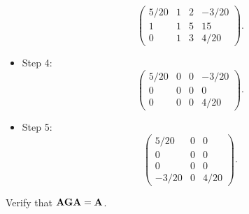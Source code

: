 \begin{Example}{}{}
\begin{itemize}
\[\begin{pmatrix}
                      5/20 & 1 & 2 & -3/20 \\
                      1    & 1 & 5 & 15    \\
                      0    & 1 & 3 & 4/20
                  \end{pmatrix}. \]
        \item Step 4:
              \[ \begin{pmatrix}
                      5/20 & 0 & 0 & -3/20 \\
                      0    & 0 & 0 & 0     \\
                      0    & 0 & 0 & 4/20
                  \end{pmatrix}. \]
        \item Step 5:
              \[ \begin{pmatrix}
                      5/20  & 0 & 0    \\
                      0     & 0 & 0    \\
                      0     & 0 & 0    \\
                      -3/20 & 0 & 4/20
                  \end{pmatrix}. \]
    \end{itemize}
    Verify that $ \mathbf{AGA}=\mathbf{A} $.
\end{Example}
